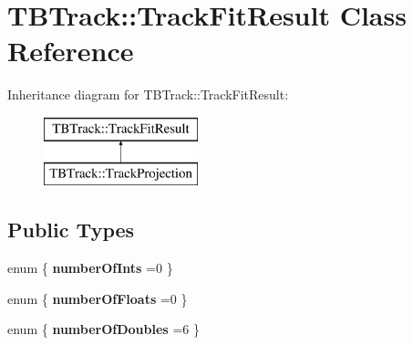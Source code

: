 \section{T\-B\-Track\-:\-:Track\-Fit\-Result Class Reference}
\label{classTBTrack_1_1TrackFitResult}
Inheritance diagram for T\-B\-Track\-:\-:Track\-Fit\-Result\-:\begin{figure}[H]
\begin{center}
\leavevmode
\includegraphics[height=2.000000cm]{classTBTrack_1_1TrackFitResult}
\end{center}
\end{figure}
\subsection*{Public Types}
\begin{DoxyCompactItemize}
\item 
enum \{ {\bfseries number\-Of\-Ints} =0
 \}
\item 
enum \{ {\bfseries number\-Of\-Floats} =0
 \}
\item 
enum \{ {\bfseries number\-Of\-Doubles} =6
 \}
\end{DoxyCompactItemize}

